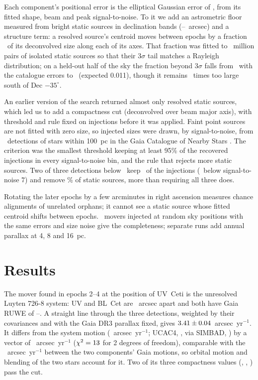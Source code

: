 \documentclass[twocolumn]{aastex631}
\begin{document}
Each component's positional error is the elliptical Gaussian error of \citet{condon1997}
\citep[see also][]{condon1998,prandoni2000}, from its fitted shape, beam and peak
signal-to-noise. To it we add an astrometric floor
measured from bright static sources in declination bands
(\vpmRealFloorMin--\vpmRealFloorMax~arcsec) and a structure term: a resolved source's centroid
moves between epochs by a fraction \vpmRealKStruct\ of its deconvolved size along each of its
axes. That fraction was fitted to \vpmRealNStaticPairs~million pairs of isolated static sources
so that their $3\sigma$ tail matches a Rayleigh distribution; on a held-out half of the sky the
fraction beyond $3\sigma$ falls from \vpmRealTailMeas\ with the catalogue errors to
\vpmRealTailFit\ (expected 0.011), though it remains \vpmRealTailSouthRatio\ times too large south
of Dec $-35^\circ$.

An earlier version of the search returned almost only resolved static sources, which led us to
add a compactness cut (deconvolved over beam major axis), with threshold and rule fixed on
injections before it was applied. Faint point sources are not fitted with zero size, so injected
sizes were drawn, by signal-to-noise, from \vpmRealNStars\
detections of stars within 100~pc in the Gaia Catalogue of Nearby Stars \citep{gcns2021}. The criterion was the smallest threshold keeping at least 95\% of the recovered injections in
every signal-to-noise bin, and the rule that rejects more static sources. Two of three detections below \vpmRealCutThr\ keep \vpmRealKeepAll\ of the
injections (\vpmRealKeepLowSNR\ below signal-to-noise 7) and remove \vpmRealStaticRej\% of static
sources, more than requiring all three does.

Rotating the later epochs by a few arcminutes in right ascension measures chance alignments of
unrelated orphans; it cannot see a static source whose fitted centroid shifts between epochs.
\vpmRealNInj\ movers injected at random sky positions with the same errors and size noise give the
completeness; separate runs add annual parallax at 4, 8 and 16~pc.

\section{Results}
\label{sec:results}
The mover found in epochs 2--4 at the position of UV~Ceti is the unresolved Luyten 726-8 system:
UV and BL~Cet are \vpmRealCompSep~arcsec apart and both have Gaia RUWE of
\vpmRealRuweMin--\vpmRealRuweMax. A straight line through the three detections, weighted by their
covariances and with the Gaia DR3 \citep{gaiadr3} parallax fixed, gives
$3.41\pm0.04$~arcsec~yr$^{-1}$. It differs from the system motion
(\vpmRealSysMu~arcsec~yr$^{-1}$; UCAC4, \citealt{ucac4}, via SIMBAD, \citealt{simbad}) by a vector
of \vpmRealSysOffset~arcsec~yr$^{-1}$ ($\chi^2=13$ for 2 degrees of freedom), comparable
with the \vpmRealOrbScale~arcsec~yr$^{-1}$ between the two components' Gaia motions, so orbital
motion and blending of the two stars account for it. Two of its three compactness values
(\vpmRealUVCompA, \vpmRealUVCompB, \vpmRealUVCompC) pass the cut.
\end{document}
